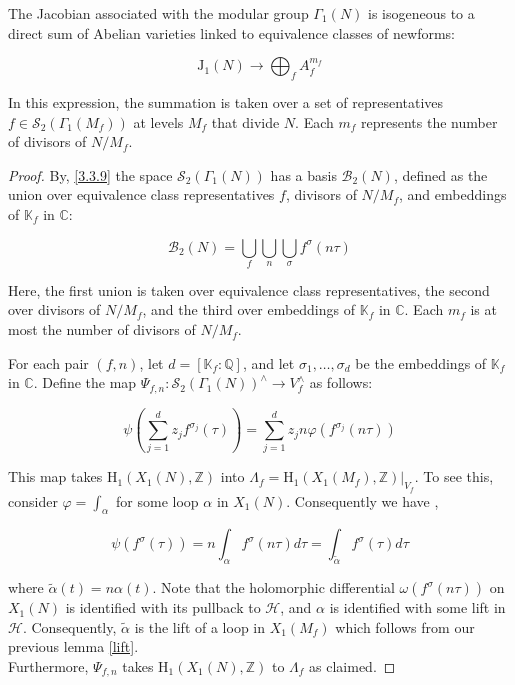 \begin{theorem}
    The Jacobian associated with the modular group \(\Gamma_{1}(N)\) is isogeneous to a direct sum of Abelian varieties linked to equivalence classes of newforms:

\[ \mathrm{J}_{1}(N) \longrightarrow \bigoplus_{f} A_{f}^{m_{f}} \]

In this expression, the summation is taken over a set of representatives \(f \in \mathcal{S}_{2}\left(\Gamma_{1}\left(M_{f}\right)\right)\) at levels \(M_{f}\) that divide \(N\). Each \(m_{f}\) represents the number of divisors of \(N / M_{f}\).

\begin{proof}\cite{diamond2005first}
   By, \ref{3.3.9} the space \(\mathcal{S}_{2}\left(\Gamma_{1}(N)\right)\) has a basis \(\mathcal{B}_{2}(N)\), defined as the union over equivalence class representatives \(f\), divisors of \(N / M_{f}\), and embeddings of \(\mathbb{K}_{f}\) in \(\mathbb{C}\):

\[ \mathcal{B}_{2}(N)=\bigcup_{f} \bigcup_{n} \bigcup_{\sigma} f^{\sigma}(n \tau) \]

Here, the first union is taken over equivalence class representatives, the second over divisors of \(N / M_{f}\), and the third over embeddings of \(\mathbb{K}_{f}\) in \(\mathbb{C}\).  Each \(m_{f}\) is at most the number of divisors of \(N / M_{f}\).

For each pair \((f, n)\), let \(d=\left[\mathbb{K}_{f}: \mathbb{Q}\right]\), and let \(\sigma_{1}, \ldots, \sigma_{d}\) be the embeddings of \(\mathbb{K}_{f}\) in \(\mathbb{C}\). Define the map \(\Psi_{f, n}: \mathcal{S}_{2}\left(\Gamma_{1}(N)\right)^{\wedge} \longrightarrow V_{f}^{\wedge}\) as follows:

\[ \psi\left(\sum_{j=1}^{d} z_{j} f^{\sigma_{j}}(\tau)\right)=\sum_{j=1}^{d} z_{j} n \varphi\left(f^{\sigma_{j}}(n \tau)\right) \]

This map takes \(\mathrm{H}_{1}\left(X_{1}(N), \mathbb{Z}\right)\) into \(\Lambda_{f}=\left.\mathrm{H}_{1}\left(X_{1}\left(M_{f}\right), \mathbb{Z}\right)\right|_{V_{f}}\). To see this, consider \(\varphi=\int_{\alpha}\) for some loop \(\alpha\) in \(X_{1}(N)\). Consequently we have ,

\[ \psi\left(f^{\sigma}(\tau)\right)=n \int_{\alpha} f^{\sigma}(n \tau) d \tau=\int_{\tilde{\alpha}} f^{\sigma}(\tau) d \tau \]

where \(\tilde{\alpha}(t)=n \alpha(t)\). Note that the holomorphic differential \(\omega\left(f^{\sigma}(n \tau)\right)\) on \(X_{1}(N)\) is identified with its pullback to \(\mathcal{H}\), and \(\alpha\) is identified with some lift in \(\mathcal{H}\). Consequently, \(\tilde{\alpha}\) is the lift of a loop in \(X_{1}\left(M_{f}\right)\) which follows from our previous lemma \ref{lift}.
\\
Furthermore, \(\Psi_{f, n}\) takes \(\mathrm{H}_{1}\left(X_{1}(N), \mathbb{Z}\right)\) to \(\Lambda_{f}\) as claimed.


\end{proof}
\end{theorem}
